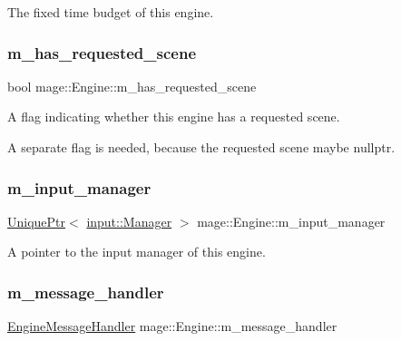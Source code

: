 The fixed time budget of this engine. \hypertarget{classmage_1_1_engine_a96089c745442208679ea2e18cc6a6097}{}\label{classmage_1_1_engine_a96089c745442208679ea2e18cc6a6097} 
\subsubsection{\texorpdfstring{m\+\_\+has\+\_\+requested\+\_\+scene}{m\_has\_requested\_scene}}
{\footnotesize\ttfamily bool mage\+::\+Engine\+::m\+\_\+has\+\_\+requested\+\_\+scene\hspace{0.3cm}{\ttfamily [private]}}

A flag indicating whether this engine has a requested scene.

A separate flag is needed, because the requested scene maybe {\ttfamily nullptr}. \hypertarget{classmage_1_1_engine_a33db04e6d27802054769ff6a30911261}{}\label{classmage_1_1_engine_a33db04e6d27802054769ff6a30911261} 
\subsubsection{\texorpdfstring{m\+\_\+input\+\_\+manager}{m\_input\_manager}}
{\footnotesize\ttfamily \hyperlink{namespacemage_a3316d7143a973e37adf1110f2e80ca31}{Unique\+Ptr}$<$ \hyperlink{classmage_1_1input_1_1_manager}{input\+::\+Manager} $>$ mage\+::\+Engine\+::m\+\_\+input\+\_\+manager\hspace{0.3cm}{\ttfamily [private]}}

A pointer to the input manager of this engine. \hypertarget{classmage_1_1_engine_a8359f22543fa6e39c948411e3023c397}{}\label{classmage_1_1_engine_a8359f22543fa6e39c948411e3023c397} 
\subsubsection{\texorpdfstring{m\+\_\+message\+\_\+handler}{m\_message\_handler}}
{\footnotesize\ttfamily \hyperlink{classmage_1_1_engine_message_handler}{Engine\+Message\+Handler} mage\+::\+Engine\+::m\+\_\+message\+\_\+handler\hspace{0.3cm}{\ttfamily [private]}}

